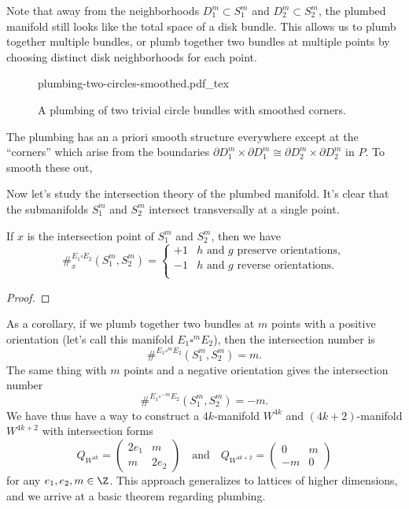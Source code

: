 Note that away from the neighborhoods $D_1^m\subset S^m_1$ and $D_2^m\subset S^m_2$, the plumbed manifold still looks like the total space of a disk bundle. This allows us to plumb together multiple bundles, or plumb together two bundles at multiple points by choosing distinct disk neighborhoods for each point.

\begin{figure}[ht]
	\centering
	{plumbing-two-circles-smoothed.pdf_tex}
	\caption{A plumbing of two trivial circle bundles with smoothed corners.}\label{fig:plumbing-two-circles}
\end{figure}

\begin{remark}\label{rmk:smoothing-corners}
	The plumbing has an a priori smooth structure everywhere except at the ``corners'' which arise from the boundaries $\partial D_1^m\times \partial D_1^m \cong \partial D_2^m\times \partial D_2^m$ in $P$. To smooth these out, 
\end{remark}

Now let's study the intersection theory of the plumbed manifold. It's clear that the submanifolds $S_1^m$ and $S_2^m$ intersect transversally at a single point.

\begin{proposition}
	If $x$ is the intersection point of $S_1^m$ and $S_2^m$, then we have
	\[
		\#^{E_1\square E_2}_{x}(S_1^m, S_2^m) = \begin{cases}
			+1 & h \textrm{ and }g\textrm{ preserve orientations}, \\
			-1 & h \textrm{ and }g\textrm{ reverse orientations}.  \\
		\end{cases}
	\]
\end{proposition}
\begin{proof}
\end{proof}

As a corollary, if we plumb together two bundles at $m$ points with a positive orientation (let's call this manifold $E_1\square^m E_2$), then the intersection number is \[\#^{E_1\square^m E_2}(S^m_1, S^m_2)=m.\] The same thing with $m$ points and a negative orientation gives the intersection number \[\#^{E_1\square^{-m} E_2}(S^m_1,S^m_2)=-m.\]
We have thus have a way to construct a $4k$-manifold $W^{4k}$ and $(4k+2)$-manifold $W^{4k+2}$ with intersection forms
\[
	Q_{W^{4k}} = \begin{pmatrix} 2e_1 & m \\ m & 2e_2\end{pmatrix}
	\quad\textrm{and}\quad
	Q_{W^{4k+2}} = \begin{pmatrix} 0 & m \\ -m & 0\end{pmatrix}
\]
for any $e_1, e_2,m\in \Z$. This approach generalizes to lattices of higher dimensions, and we arrive at a basic theorem regarding plumbing.

